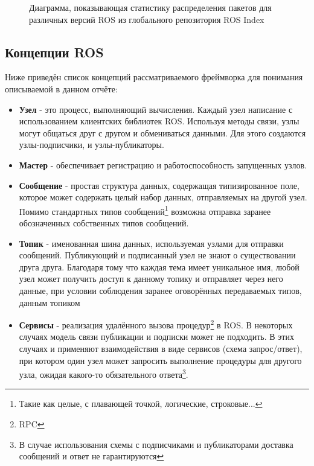 \documentclass[12pt,a4paper]{scrartcl}
\begin{document}
				\begin{figure}[h]
					\caption{Диаграмма, показывающая статистику распределения пакетов для различных версий ROS из глобального репозитория ROS Index}
					\label{fig:ROSPackages}
				\end{figure}
			
			\subsection{Концепции ROS}
				Ниже приведён список концепций рассматриваемого фреймворка для понимания описываемой в данном отчёте: 
				\begin{itemize}
					\item {\textbf{Узел} - это процесс, выполняющий вычисления. Каждый узел написание с использованием клиентских библиотек ROS. Используя методы связи, узлы могут общаться друг с другом и обмениваться данными. Для этого создаются узлы-подписчики, и узлы-публикаторы.}
					\item {\textbf{Мастер} - обеспечивает регистрацию и работоспособность запущенных узлов.}
					\item {\textbf{Сообщение} - простая структура данных, содержащая типизированное поле, которое может содержать целый набор данных, отправляемых на другой узел. Помимо стандартных типов сообщений\footnote{Такие как целые, с плавающей точкой, логические, строковые...} возможна отправка заранее обозначенных собственных типов сообщений.}
					\item {\textbf{Топик} - именованная шина данных, используемая узлами для отправки сообщений. Публикующий и подписанный узел не знают о существовании друга друга. Благодаря тому что каждая тема имеет уникальное имя, любой узел может получить доступ к данному топику и отправляет через него данные, при условии соблюдения заранее оговорённых передаваемых типов, данным топиком}
					\item {\textbf{Сервисы} - реализация удалённого вызова процедур\footnote{RPC} в ROS. В некоторых случаях модель связи публикации и подписки может не подходить. В этих случаях и применяют взаимодействия в виде сервисов (схема запрос/ответ), при котором один узел может запросить выполнение процедуры для другого узла, ожидая какого-то обязательного ответа\footnote{В случае использования схемы с подписчиками и публикаторами доставка сообщений и ответ не гарантируются}\cite{bib:ROSDefinition}. }
				\end{itemize}
				
\end{document}
